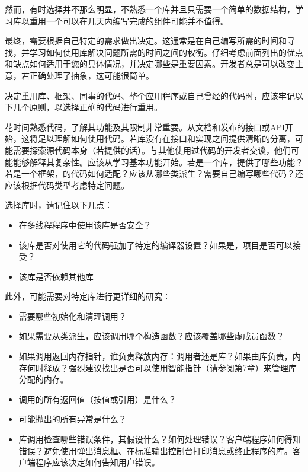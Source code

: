 然而，有时选择并不那么明显，不熟悉一个库并且只需要一个简单的数据结构，学习库以重用一个可以在几天内编写完成的组件可能并不值得。

最终，需要根据自己特定的需求做出决定。这通常是在自己编写所需的时间和寻找，并学习如何使用库解决问题所需的时间之间的权衡。仔细考虑前面列出的优点和缺点如何适用于您的具体情况，并决定哪些是重要因素。开发者总是可以改变主意，若正确处理了抽象，这可能很简单。


决定重用库、框架、同事的代码、整个应用程序或自己曾经的代码时，应该牢记以下几个原则，以选择正确的代码进行重用。


花时间熟悉代码，了解其功能及其限制非常重要。从文档和发布的接口或API开始，这将足以理解如何使用代码。若库没有在接口和实现之间提供清晰的分离，可能需要探索源代码本身（若提供的话）。与其他使用过代码的开发者交谈，他们可能能够解释其复杂性。应该从学习基本功能开始。若是一个库，提供了哪些功能？若是一个框架，的代码如何适配？应该从哪些类派生？需要自己编写哪些代码？还应该根据代码类型考虑特定问题。

选择库时，请记住以下几点：

\begin{itemize}
\item
在多线程程序中使用该库是否安全？

\item
该库是否对使用它的代码强加了特定的编译器设置？如果是，项目是否可以接受？

\item
该库是否依赖其他库
\end{itemize}

此外，可能需要对特定库进行更详细的研究：

\begin{itemize}
\item
需要哪些初始化和清理调用？

\item
如果需要从类派生，应该调用哪个构造函数？应该覆盖哪些虚成员函数？

\item
如果调用返回内存指针，谁负责释放内存：调用者还是库？如果由库负责，内存何时释放？强烈建议找出是否可以使用智能指针（请参阅第7章）来管理库分配的内存。

\item
调用的所有返回值（按值或引用）是什么？

\item
可能抛出的所有异常是什么？

\item
库调用检查哪些错误条件，其假设什么？如何处理错误？客户端程序如何得知错误？避免使用弹出消息框、在标准输出控制台打印消息或终止程序的库。客户端程序应该决定如何告知用户错误。
\end{itemize}

